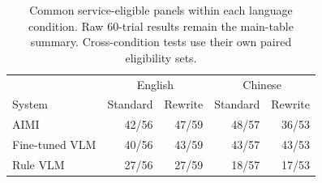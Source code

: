 \begin{table}[t]
\centering\footnotesize
\setlength{\tabcolsep}{2pt}
\begin{tabular}{@{}lrrrr@{}}
\toprule
 & \multicolumn{2}{c}{English} & \multicolumn{2}{c}{Chinese}\\
System & Standard & Rewrite & Standard & Rewrite\\
\midrule
AIMI & 42/56 & 47/59 & 48/57 & 36/53\\
Fine-tuned VLM & 40/56 & 43/59 & 43/57 & 43/53\\
Rule VLM & 27/56 & 27/59 & 18/57 & 17/53\\
\bottomrule
\end{tabular}
\caption{Common service-eligible panels within each language condition. Raw 60-trial results remain the main-table summary. Cross-condition tests use their own paired eligibility sets.}
\label{tab:language-eligible}
\end{table}
